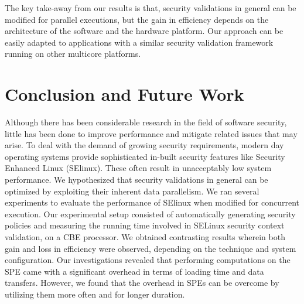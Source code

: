 \documentclass[conference]{IEEEtran}
\newcommand{\eat}[1]{}
\begin{document}
The key take-away from our results is that, security validations in
general can be modified for parallel executions, but the gain in
efficiency depends on the architecture of the software and the
hardware platform.  Our approach can be easily adapted to applications
with a similar security validation framework running on other
multicore platforms.

\section{Conclusion and Future Work}\label{conclusion}

Although there has been considerable research in the field of software
security, little has been done to improve performance and mitigate
related issues that may arise.  To deal with the demand of growing
security requirements, modern day operating systems provide
sophisticated in-built security features like Security Enhanced Linux
(SElinux).  These often result in unacceptably low system performance.
We hypothesized that security validations in general can be optimized
by exploiting their inherent data parallelism.  We ran several
experiments to evaluate the performance of SElinux when modified for
concurrent execution.  Our experimental setup consisted of
automatically generating security policies and measuring the running
time involved in SELinux security context validation, on a CBE
processor.  We obtained contrasting results wherein both gain and loss
in efficiency were observed, depending on the technique and system
configuration.  Our investigations revealed that performing
computations on the SPE came with a significant overhead in terms of
loading time and data transfers.  However, we found that the overhead
in SPEs can be overcome by utilizing them more often and for longer
duration.

\eat{ The performance comparison was made under two
different parameters - the number of rules in the policies and the
AVC size in SELinux security server module. Our
results showed that the use of optimal AVC size ensured the performance
overhead was within an acceptable limit, but this did not hold for
policies with a reasonably large number of rules. We also observed
contrasting results with the use of parallel execution techniques, in
fact a loss in performance when compared to single core performance with optimal AVC size. Whereas a gain in performance of up to 43\% was
measured with one of the multi-processor techniques with the minimal
AVC size. Our investigations revealed that Synergistic Processing Element
(SPE) execution had a significant overhead in terms of loading time
and data transfers. However, with the minimal AVC size, the SPEs were
utilized more often and long enough to overcome the delay due to
loading and data transfers and thereby register a net gain in
efficiency.}
\end{document}
